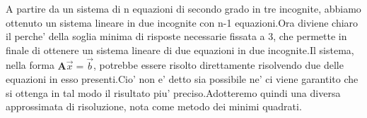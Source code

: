 A partire da un sistema di n equazioni di secondo grado in tre incognite, abbiamo ottenuto un sistema lineare in due incognite con n-1 equazioni.\newline Ora diviene chiaro il perche' della soglia minima di risposte necessarie fissata a 3, che permette in finale di ottenere un sistema lineare di due equazioni in due incognite.\newline Il sistema, nella forma $\textbf{A}\overrightarrow{x}=\overrightarrow{b}$, potrebbe essere risolto direttamente risolvendo due delle equazioni in esso presenti.\newline Cio' non e' detto sia possibile ne' ci viene garantito che si ottenga in tal modo il risultato piu' preciso.\newline Adotteremo quindi una diversa approssimata di risoluzione, nota come metodo dei minimi quadrati.\newline


